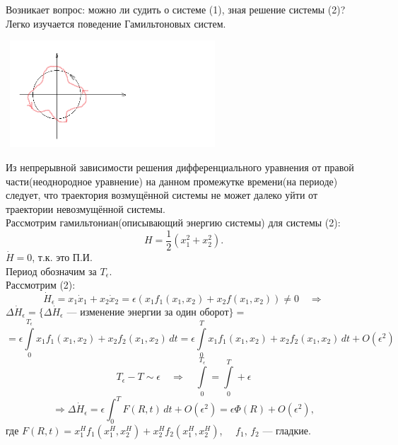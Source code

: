  	Возникает вопрос: можно ли судить о системе (1), зная решение системы (2)?\\
 	
 	Легко изучается поведение Гамильтоновых систем.\\
 	
 	\begin{center}
 		\includegraphics[width=8cm, height=4cm]{ch10/1}
 	\end{center} 
 	
 	Из непрерывной зависимости решения дифференциального уравнения от правой части(неоднородное уравнение) на данном промежутке времени(на периоде) следует, что траектория возмущённой системы не может далеко уйти от траектории невозмущённой системы.\\
 	
 	Рассмотрим гамильтониан(описывающий энергию системы) для системы (2):
 	\[
 	H=\dfrac{1}{2}(x_1^2 + x_2^2).
 	\]
 	\(\dot H = 0\), т.к. это П.И.\\
 	Период обозначим за  \(T_{\epsilon}\).\\
 	
 	
 	Рассмотрим (2):
 	\[
 	\dot H_{\epsilon} = x_1 \dot x_1 + x_2 \dot x_2 = \epsilon(x_1 f_1(x_1, x_2) + x_2 f(x_1, x_2)) \neq 0  \quad \Rightarrow
 	\]
 	\(
 	\Delta \dot H_{\epsilon}  = \{\Delta \dot H_{\epsilon}\) ---  изменение энергии за один оборот\(\}= \)
 	\[
 	=\epsilon \int \limits_0^{T_{\epsilon}} x_1 f_1(x_1, x_2) + x_2 f_2(x_1, x_2) \, dt = \epsilon \int \limits_0^{T} x_1 f_1(x_1, x_2) + x_2 f_2(x_1, x_2) \, dt  + O(\epsilon^2) 
 	\]
 	\[
 	T_{\epsilon}-T \sim\epsilon \quad \Rightarrow \quad \int \limits_0^{T_{\epsilon}} =  \int \limits_0^{T} + \epsilon
 	\]
 	\[
 	\Rightarrow \Delta \dot H_{\epsilon} = \epsilon \int_0^T F(R, t) \, dt + O(\epsilon^2)=\epsilon \Phi(R) + O(\epsilon^2),
 	\]
 	где \(F(R, t) = x_1^H f_1(x_1^H, x_2^H) + x_2^H f_2(x_1^H, x_2^H)\), \( \quad f_1, \, f_2\) --- гладкие.\\
 	
